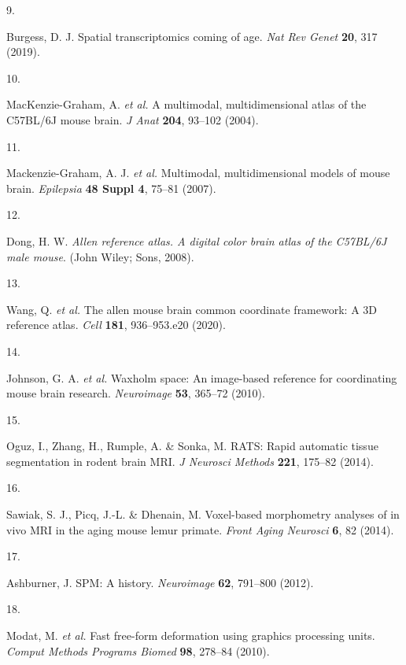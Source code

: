 \documentclass[
  12pt,
]{article}
\newlength{\cslhangindent}
\newlength{\csllabelwidth}
\newenvironment{CSLReferences}[2] %
 {%
  \setlength{\parindent}{0pt}
  \ifodd #1 \everypar{\setlength{\hangindent}{\cslhangindent}}\ignorespaces\fi
  \ifnum #2 > 0
  \setlength{\parskip}{#2\baselineskip}
  \fi
 }%
 {}
\newcommand{\CSLLeftMargin}[1]{\parbox[t]{\csllabelwidth}{#1}}
\newcommand{\CSLRightInline}[1]{\parbox[t]{\linewidth - \csllabelwidth}{#1}\break}
\begin{document}
\begin{CSLReferences}{0}{0}
\leavevmode{}%
\CSLLeftMargin{9. }
\CSLRightInline{Burgess, D. J. Spatial transcriptomics coming of age.
\emph{Nat Rev Genet} \textbf{20}, 317 (2019).}

\leavevmode{}%
\CSLLeftMargin{10. }
\CSLRightInline{MacKenzie-Graham, A. \emph{et al.} A multimodal,
multidimensional atlas of the C57BL/6J mouse brain. \emph{J Anat}
\textbf{204}, 93--102 (2004).}

\leavevmode{}%
\CSLLeftMargin{11. }
\CSLRightInline{Mackenzie-Graham, A. J. \emph{et al.} Multimodal,
multidimensional models of mouse brain. \emph{Epilepsia} \textbf{48
Suppl 4}, 75--81 (2007).}

\leavevmode{}%
\CSLLeftMargin{12. }
\CSLRightInline{Dong, H. W. \emph{Allen reference atlas. A digital color
brain atlas of the C57BL/6J male mouse}. (John Wiley; Sons, 2008).}

\leavevmode{}%
\CSLLeftMargin{13. }
\CSLRightInline{Wang, Q. \emph{et al.} The allen mouse brain common
coordinate framework: A 3D reference atlas. \emph{Cell} \textbf{181},
936--953.e20 (2020).}

\leavevmode{}%
\CSLLeftMargin{14. }
\CSLRightInline{Johnson, G. A. \emph{et al.} Waxholm space: An
image-based reference for coordinating mouse brain research.
\emph{Neuroimage} \textbf{53}, 365--72 (2010).}

\leavevmode{}%
\CSLLeftMargin{15. }
\CSLRightInline{Oguz, I., Zhang, H., Rumple, A. \& Sonka, M. RATS: Rapid
automatic tissue segmentation in rodent brain MRI. \emph{J Neurosci
Methods} \textbf{221}, 175--82 (2014).}

\leavevmode{}%
\CSLLeftMargin{16. }
\CSLRightInline{Sawiak, S. J., Picq, J.-L. \& Dhenain, M. Voxel-based
morphometry analyses of in vivo MRI in the aging mouse lemur primate.
\emph{Front Aging Neurosci} \textbf{6}, 82 (2014).}

\leavevmode{}%
\CSLLeftMargin{17. }
\CSLRightInline{Ashburner, J. {SPM}: A history. \emph{Neuroimage}
\textbf{62}, 791--800 (2012).}

\leavevmode{}%
\CSLLeftMargin{18. }
\CSLRightInline{Modat, M. \emph{et al.} Fast free-form deformation using
graphics processing units. \emph{Comput Methods Programs Biomed}
\textbf{98}, 278--84 (2010).}


\end{CSLReferences}
\end{document}
